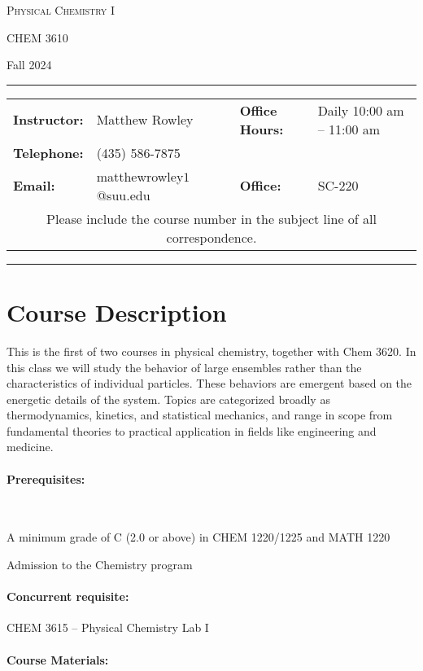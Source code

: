 \documentclass[12pt, letterpaper]{article}
\begin{document}
\begin{center}
{\Large \textsc{Physical Chemistry I}}

CHEM 3610
\end{center}
\begin{center}
	{\large Fall 2024}
\end{center}
\begin{center}
	\rule{0.99\textwidth}{0.4pt}
	\begin{tabular}{llcll}
		\textbf{Instructor:} & Matthew Rowley           &  & \textbf{Office Hours:} & Daily 10:00 am -- 11:00 am \\
		\textbf{Telephone:}  & (435) 586-7875           &  &                        &  \\
		\textbf{Email:}      & matthewrowley$1$@suu.edu &  & \textbf{Office:}       & SC-220                   \\
		\multicolumn{5}{c}{Please include the course number in the subject line of all correspondence.}
	\end{tabular}
	\rule{0.99\textwidth}{0.4pt}
\end{center}

\section*{Course Description}
This is the first of two courses in physical chemistry, together with Chem 3620. In this class we will study the behavior of large ensembles rather than the characteristics of individual particles. These behaviors are emergent based on the energetic details of the system. Topics are categorized broadly as thermodynamics, kinetics, and statistical mechanics, and range in scope from fundamental theories to practical application in fields like engineering and medicine.

\paragraph{Prerequisites:}~

A minimum grade of C (2.0 or above) in CHEM 1220/1225 and MATH 1220

Admission to the Chemistry program

\paragraph{Concurrent requisite:}
CHEM 3615 -- Physical Chemistry Lab I

\paragraph{Course Materials:} ~
\end{document}
